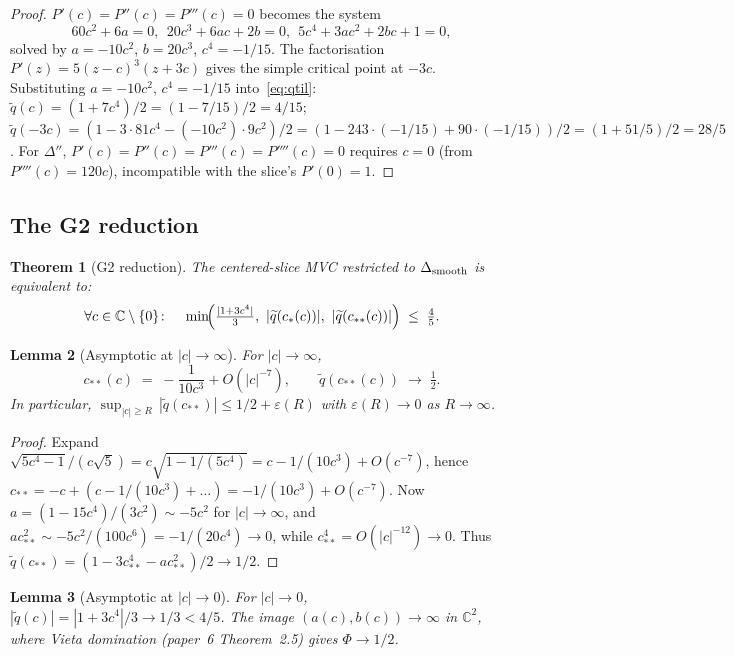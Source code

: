 \documentclass[11pt,a4paper]{article}
\newtheorem{theorem}{Theorem}[section]
\newtheorem{lemma}[theorem]{Lemma}
\begin{document}
\begin{proof}
$P'(c)=P''(c)=P'''(c)=0$ becomes the system
\[
60c^2+6a=0,\ \ 20c^3+6ac+2b=0,\ \ 5c^4+3ac^2+2bc+1=0,
\]
solved by $a=-10c^2$, $b=20c^3$, $c^4=-1/15$. The factorisation
$P'(z)=5(z-c)^3(z+3c)$ gives the simple critical point at $-3c$.
Substituting $a=-10c^2$, $c^4=-1/15$ into~\eqref{eq:qtil}:
$\widetilde q(c)=(1+7c^4)/2=(1-7/15)/2 = 4/15$;
$\widetilde q(-3c) = (1-3\cdot 81 c^4 - (-10c^2)\cdot 9c^2)/2
=(1-243\cdot(-1/15)+90\cdot(-1/15))/2 = (1+51/5)/2 = 28/5$.
For $\Delta''$, $P'(c)=P''(c)=P'''(c)=P''''(c)=0$ requires $c=0$
(from $P''''(c)=120c$), incompatible with the slice's $P'(0)=1$.
\end{proof}

\subsection{The G2 reduction}

\begin{theorem}[G2 reduction]\label{thm:G2-reduction}
The centered-slice MVC restricted to $\Delta_{\rm smooth}$ is
equivalent to:
\begin{equation}
\forall c\in\mathbb{C}\setminus\{0\}\colon\quad
\min\!\Bigl(\tfrac{|1+3c^4|}{3},\ |\widetilde q(c_*(c))|,\ |\widetilde q(c_{**}(c))|\Bigr)\;\le\;\tfrac{4}{5}.
\label{eq:G2-reduction}
\end{equation}
\end{theorem}

\begin{lemma}[Asymptotic at $|c|\to\infty$]\label{lem:G2-infty}
For $|c|\to\infty$,
\[
c_{**}(c) \;=\; -\frac{1}{10c^3} + O(|c|^{-7}),
\qquad
\widetilde q(c_{**}(c)) \;\xrightarrow[]{}\; \tfrac{1}{2}.
\]
In particular, $\sup_{|c|\ge R}\,|\widetilde q(c_{**})| \le 1/2 + \varepsilon(R)$
with $\varepsilon(R)\to 0$ as $R\to\infty$.
\end{lemma}

\begin{proof}
Expand $\sqrt{5c^4-1}/(c\sqrt 5) = c\sqrt{1-1/(5c^4)} =
c - 1/(10c^3) + O(c^{-7})$, hence $c_{**} = -c + (c-1/(10c^3)+\dots)
= -1/(10c^3) + O(c^{-7})$.
Now $a=(1-15c^4)/(3c^2)\sim -5c^2$ for $|c|\to\infty$, and
$ac_{**}^2 \sim -5c^2/(100c^6) = -1/(20 c^4)\to 0$, while
$c_{**}^4 = O(|c|^{-12})\to 0$. Thus $\widetilde q(c_{**}) =
(1 - 3c_{**}^4 - ac_{**}^2)/2 \to 1/2$.
\end{proof}

\begin{lemma}[Asymptotic at $|c|\to 0$]\label{lem:G2-zero}
For $|c|\to 0$, $|\widetilde q(c)|=|1+3c^4|/3 \to 1/3 < 4/5$.
The image $(a(c),b(c))\to\infty$ in $\mathbb{C}^2$, where Vieta
domination (paper~6 Theorem~2.5) gives $\Phi\to 1/2$.
\end{lemma}
\end{document}
